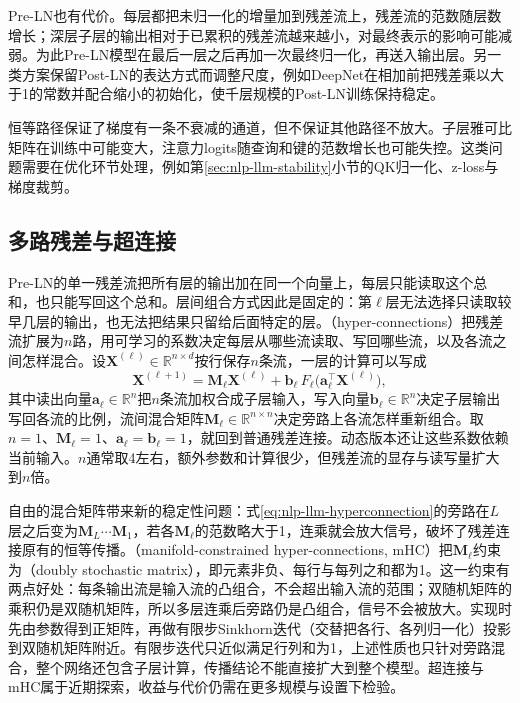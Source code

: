 Pre-LN也有代价。每层都把未归一化的增量加到残差流上，残差流的范数随层数增长；深层子层的输出相对于已累积的残差流越来越小，对最终表示的影响可能减弱。为此Pre-LN模型在最后一层之后再加一次最终归一化，再送入输出层。另一类方案保留Post-LN的表达方式而调整尺度，例如DeepNet在相加前把残差乘以大于1的常数并配合缩小的初始化，使千层规模的Post-LN训练保持稳定。

恒等路径保证了梯度有一条不衰减的通道，但不保证其他路径不放大。子层雅可比矩阵在训练中可能变大，注意力logits随查询和键的范数增长也可能失控。这类问题需要在优化环节处理，例如第\ref{sec:nlp-llm-stability}小节的QK归一化、z-loss与梯度裁剪。

\subsection{多路残差与超连接}
\label{sec:nlp-llm-hyperconnections}

Pre-LN的单一残差流把所有层的输出加在同一个向量上，每层只能读取这个总和，也只能写回这个总和。层间组合方式因此是固定的：第$\ell$层无法选择只读取较早几层的输出，也无法把结果只留给后面特定的层。（hyper-connections）把残差流扩展为$n$路，用可学习的系数决定每层从哪些流读取、写回哪些流，以及各流之间怎样混合。设$\bm X^{(\ell)}\in\mathbb R^{n\times d}$按行保存$n$条流，一层的计算可以写成
\begin{equation}
 \bm X^{(\ell+1)}=
 \bm M_\ell\bm X^{(\ell)}+
 \bm b_\ell\,F_\ell\bigl(\bm a_\ell^{\top}\bm X^{(\ell)}\bigr),
 \label{eq:nlp-llm-hyperconnection}
\end{equation}
其中读出向量$\bm a_\ell\in\mathbb R^n$把$n$条流加权合成子层输入，写入向量$\bm b_\ell\in\mathbb R^n$决定子层输出写回各流的比例，流间混合矩阵$\bm M_\ell\in\mathbb R^{n\times n}$决定旁路上各流怎样重新组合。取$n=1$、$\bm M_\ell=1$、$\bm a_\ell=\bm b_\ell=1$，就回到普通残差连接。动态版本还让这些系数依赖当前输入。$n$通常取4左右，额外参数和计算很少，但残差流的显存与读写量扩大到$n$倍。

自由的混合矩阵带来新的稳定性问题：式\eqref{eq:nlp-llm-hyperconnection}的旁路在$L$层之后变为$\bm M_L\cdots\bm M_1$，若各$\bm M_\ell$的范数略大于1，连乘就会放大信号，破坏了残差连接原有的恒等传播。（manifold-constrained hyper-connections, mHC）把$\bm M_\ell$约束为（doubly stochastic matrix），即元素非负、每行与每列之和都为1。这一约束有两点好处：每条输出流是输入流的凸组合，不会超出输入流的范围；双随机矩阵的乘积仍是双随机矩阵，所以多层连乘后旁路仍是凸组合，信号不会被放大。实现时先由参数得到正矩阵，再做有限步Sinkhorn迭代（交替把各行、各列归一化）投影到双随机矩阵附近。有限步迭代只近似满足行列和为1，上述性质也只针对旁路混合，整个网络还包含子层计算，传播结论不能直接扩大到整个模型。超连接与mHC属于近期探索，收益与代价仍需在更多规模与设置下检验。

